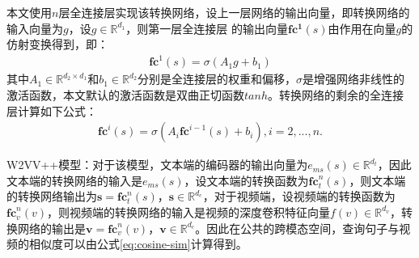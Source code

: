本文使用$n$层全连接层实现该转换网络，设上一层网络的输出向量，即转换网络的输入向量为$g$，设$g \in \mathbb{R}^{d_1}$，则第一层全连接层
的输出向量$\bm{\mathbf{fc^1}}(s)$由作用在向量$g$的仿射变换得到，即：
\begin{equation}
    \label{eq:fc-1}
    \begin{aligned}
        \bm{\mathbf{fc}}^1(s) = \sigma(A_1 g + b_1)
    \end{aligned}
\end{equation}
其中$A_1 \in \mathbb{R}^{d_2 \times d_1}$和$b_1 \in \mathbb{R}^{d_2}$分别是全连接层的权重和偏移，$\sigma$是增强网络非线性的激活函数，本文默认的激活函数是双曲正切函数$tanh$。转换网络的剩余的全连接层计算如下公式：
\begin{equation}
    \label{eq:fc-k}
    \begin{aligned}
        \bm{\mathbf{fc}}^i(s) = \sigma(A_i\bm{\mathbf{fc}}^{i-1}(s) + b_i), i=2,...,n.
    \end{aligned}
\end{equation}


W2VV++模型：对于该模型，文本端的编码器的输出向量为$e_{ms}(s) \in \mathbb{R}^{d_t}$，因此文本端的转换网络的输入是$e_{ms}(s)$，设文本端的转换函数为$\bm{\mathbf{fc}}_t^n(s)$，则文本端的转换网络输出为$\mathbf{s} = \bm{\mathbf{fc}}_t^n(s)$，$\mathbf{s} \in \mathbb{R}^{d_c}$，对于视频端，设视频端的转换函数为$\bm{\mathbf{fc}}_v^n(v)$，则视频端的转换网络的输入是视频的深度卷积特征向量$f(v) \in \mathbb{R}^{d_v}$，转换网络的输出是$\mathbf{v} = \bm{\mathbf{fc}}_v^n(v)$，$\mathbf{v} \in \mathbb{R}^{d_c}$。因此在公共的跨模态空间，查询句子与视频的相似度可以由公式\ref{eq:cosine-sim}计算得到。


